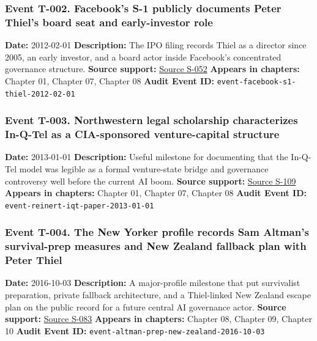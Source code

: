 \documentclass[
  american,
  11pt,
  letterpaper,
]{article}
\begin{document}
\subsubsection{Event T-002. Facebook's S-1 publicly documents Peter
Thiel's board seat and early-investor
role}\label{event-t-002-facebook-s-s-1-publicly-documents-peter-thiel-s-board-seat-and-early-investor-role}

\textbf{Date:} 2012-02-01 \textbf{Description:} The IPO filing records
Thiel as a director since 2005, an early investor, and a board actor
inside Facebook's concentrated governance structure. \textbf{Source
support:}
\hyperref[source-s-052-facebook-inc-registration-statement-on-form-s-1]{Source
S-052} \textbf{Appears in chapters:} Chapter 01, Chapter 07, Chapter 08
\textbf{Audit Event ID:} \texttt{event-facebook-s1-thiel-2012-02-01}

\subsubsection{Event T-003. Northwestern legal scholarship characterizes
In-Q-Tel as a CIA-sponsored venture-capital
structure}\label{event-t-003-northwestern-legal-scholarship-characterizes-in-q-tel-as-a-cia-sponsored-venture-capital-structure}

\textbf{Date:} 2013-01-01 \textbf{Description:} Useful milestone for
documenting that the In-Q-Tel model was legible as a formal
venture-state bridge and governance controversy well before the current
AI boom. \textbf{Source support:}
\hyperref[source-s-109-in-q-tel-the-central-intelligence-agency-as-venture-capitalist]{Source
S-109} \textbf{Appears in chapters:} Chapter 01, Chapter 07, Chapter 08
\textbf{Audit Event ID:} \texttt{event-reinert-iqt-paper-2013-01-01}

\subsubsection{Event T-004. The New Yorker profile records Sam Altman's
survival-prep measures and New Zealand fallback plan with Peter
Thiel}\label{event-t-004-the-new-yorker-profile-records-sam-altman-s-survival-prep-measures-and-new-zealand-fallback-plan-with-peter-thiel}

\textbf{Date:} 2016-10-03 \textbf{Description:} A major-profile
milestone that put survivalist preparation, private fallback
architecture, and a Thiel-linked New Zealand escape plan on the public
record for a future central AI governance actor. \textbf{Source
support:} \hyperref[source-s-083-sam-altman-s-manifest-destiny]{Source
S-083} \textbf{Appears in chapters:} Chapter 08, Chapter 09, Chapter 10
\textbf{Audit Event ID:}
\texttt{event-altman-prep-new-zealand-2016-10-03}
\end{document}
